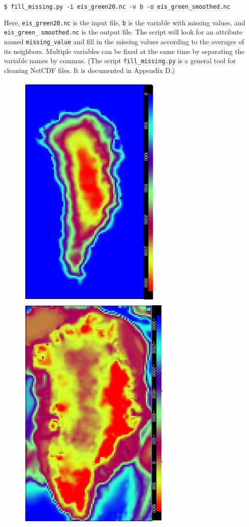 \documentclass[11pt,final]{amsart}
\begin{document}
\verb|$ fill_missing.py -i eis_green20.nc -v b -o eis_green_smoothed.nc|

\noindent Here, \verb|eis_green20.nc| is the input file, \verb|b| is the variable with missing values, and \verb|eis_green_|  \verb|smoothed.nc| is the output file. The script will look for an attribute named \verb|missing_value| and fill in the missing values according to the averages of its neighbors.  Multiple variables can be fixed at the same time by separating the variable names by commas.  (The script \verb|fill_missing.py| is a general tool for cleaning NetCDF files.  It is documented in Appendix D.)  

\begin{figure}[ht]
\includegraphics[width=2.8in,keepaspectratio=true]{figs/EISgreen_thick}\qquad\includegraphics[width=3.0in,keepaspectratio=true]{figs/EISgreen_bed}

\end{figure}
\end{document}
